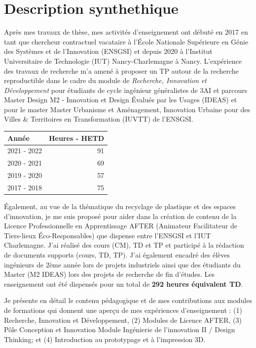 \documentclass[
  12pt,
  oneside]{book}
\begin{document}
\hypertarget{description-synthethique}{%
\section{Description synthethique}\label{description-synthethique}}

Après mes travaux de thèse, mes activités d'enseignement ont débuté en 2017 en tant que chercheur contractuel vacataire à l'École Nationale Supérieure en Génie des Systèmes et de l'Innovation (ENSGSI) et depuis 2020 à l'Institut Universitaire de Technologie (IUT) Nancy-Charlemagne à Nancy.
L'expérience des travaux de recherche m'a amené à proposer un TP autour de la recherche reproductible dans le cadre du module de \emph{Recherche, Innovation et Développement} pour étudiants de cycle ingénieur généralistes de 3AI et parcours Master Design M2 - Innovation et Design Évalués par les Usages (IDEAS) et pour le master Master Urbanisme et Aménagement, Innovation Urbaine pour des Villes \& Territoires en Transformation (IUVTT) de l'ENSGSI.

\begin{table}
\centering
\begin{tabular}[t]{lr}
\toprule
Année & Heures - HETD\\
\midrule
2021 - 2022 & 91\\
2020 - 2021 & 69\\
2019 - 2020 & 57\\
2017 - 2018 & 75\\
\bottomrule
\end{tabular}
\end{table}

Également, au vue de la thématique du recyclage de plastique et des espaces d'innovation, je me suis proposé pour aider dans la création de contenu de la Licence Professionnelle en Apprentissage AFTER (Animateur Facilitateur de Tiers-lieux Éco-Responsables) que dispense entre l'ENSGSI et l'IUT Charlemagne. J'ai réalisé des cours (CM), TD et TP et participé à la rédaction de documents supports (cours, TD, TP). J'ai également encadré des élèves ingénieurs de 2ème année lors de projets industriels ainsi que des étudiants du Master (M2 IDEAS) lors des projets de recherche de fin d'études. Les enseignement ont été dispensés pour un total de \textbf{292 heures équivalent TD}.

Je présente en détail le contenu pédagogique et de mes contributions aux modules de formations qui donnent une aperçu de mes expériences d'enseignement : (1) Recherche, Innovation et Développement, (2) Modules de Licence AFTER, (3) Pôle Conception et Innovation Module Ingénierie de l'innovation II / Design Thinking; et (4) Introduction au prototypage et à l'impression 3D.
\end{document}
